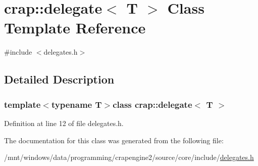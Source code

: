 \hypertarget{classcrap_1_1delegate}{}\section{crap\+:\+:delegate$<$ T $>$ Class Template Reference}
\label{classcrap_1_1delegate}


{\ttfamily \#include $<$delegates.\+h$>$}



\subsection{Detailed Description}
\subsubsection*{template$<$typename T$>$class crap\+::delegate$<$ T $>$}



Definition at line 12 of file delegates.\+h.



The documentation for this class was generated from the following file\+:\begin{DoxyCompactItemize}
\item 
/mnt/windows/data/programming/crapengine2/source/core/include/\hyperlink{delegates_8h}{delegates.\+h}\end{DoxyCompactItemize}
